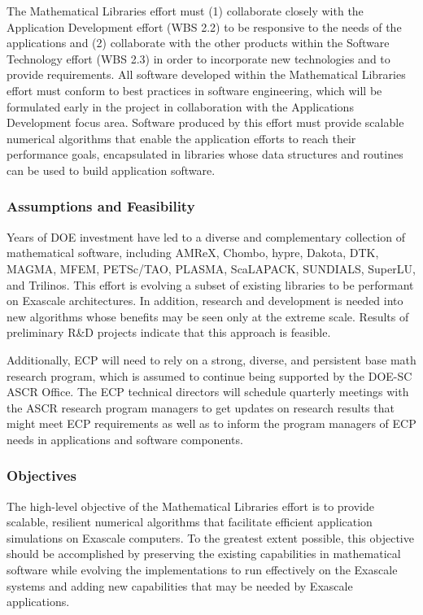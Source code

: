 The Mathematical Libraries effort must (1) collaborate closely with the Application Development effort (WBS 2.2) to be responsive to the needs of the applications and (2) collaborate with the other products within the Software Technology effort (WBS 2.3) in order to incorporate new technologies and to provide requirements. All software developed within the Mathematical Libraries effort must conform to best practices in software engineering, which will be formulated early in the project in collaboration with the Applications Development focus area. Software produced by this effort must provide scalable numerical algorithms that enable the application efforts to reach their performance goals, encapsulated in libraries whose data structures and routines can be used to build application software.

\subsubsection{Assumptions and Feasibility}
Years of DOE investment have led to a diverse and complementary collection of mathematical software, including AMReX, Chombo, hypre, Dakota, DTK, MAGMA, MFEM, PETSc/TAO, PLASMA, ScaLAPACK, SUNDIALS, SuperLU, and Trilinos. This effort is evolving a subset of existing libraries to be performant on Exascale architectures. In addition, research and development is needed into new algorithms whose benefits may be seen only at the extreme scale. Results of preliminary R\&D projects indicate that this approach is feasible.

Additionally, ECP will need to rely on a strong, diverse, and persistent base math research program, which is assumed to continue being supported by the DOE-SC ASCR Office. The ECP technical directors will schedule quarterly meetings with the ASCR research program managers to get updates on research results that might meet ECP requirements as well as to inform the program managers of ECP needs in applications and software components.

\subsubsection{Objectives}
The high-level objective of the Mathematical Libraries effort is to provide scalable, resilient numerical algorithms that facilitate efficient application simulations on Exascale computers. To the greatest extent possible, this objective should be accomplished by preserving the existing capabilities in mathematical software while evolving the implementations to run effectively on the Exascale systems and adding new capabilities that may be needed by Exascale applications.


